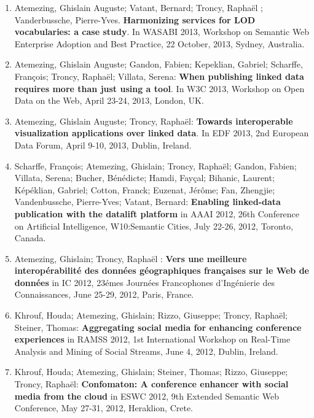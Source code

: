 \begin{enumerate}
\item Atemezing, Ghislain Auguste; Vatant, Bernard; Troncy, Rapha{\"e}l ; Vanderbussche, Pierre-Yves. \textbf{Harmonizing services for LOD vocabularies: a case study}. In WASABI 2013, Workshop on Semantic Web Enterprise Adoption and Best Practice, 22 October, 2013, Sydney, Australia.

\item Atemezing, Ghislain Auguste; Gandon, Fabien; Kepeklian, Gabriel; Scharffe, Fran\c{c}ois; Troncy, Rapha{\"e}l; Villata, Serena: 
\textbf{When publishing linked data requires more than just using a tool}. In 
W3C 2013, Workshop on Open Data on the Web, April 23-24, 2013, London, UK.

\item Atemezing, Ghislain Auguste; Troncy,  Rapha{\"e}l: \textbf{
Towards interoperable visualization applications over linked data}. In 
EDF 2013, 2nd European Data Forum, April 9-10, 2013, Dublin, Ireland.


\item Scharffe, Fran\c cois; Atemezing, Ghislain; Troncy, Rapha\"{e}l; Gandon, Fabien; Villata, Serena; Bucher, B\'{e}n\'{e}dicte; Hamdi, Fay\c cal; Bihanic, Laurent; K\'{e}p\'{e}klian, Gabriel; Cotton, Franck; Euzenat, J\'{e}r\^{o}me; Fan, Zhengjie; Vandenbussche, Pierre-Yves; Vatant, Bernard: \textbf{Enabling linked-data publication with the datalift platform} in
AAAI 2012, 26th Conference on Artificial Intelligence, W10:Semantic Cities, July 22-26, 2012, Toronto, Canada.


\item Atemezing, Ghislain; Troncy, Rapha\"{e}l : \textbf{Vers une meilleure interop\'{e}rabilit\'{e} des donn\'{e}es g\'{e}ographiques fran\c caises sur le Web de donn\'{e}es} in IC 2012, 23\'{e}mes Journ\'{e}es Francophones d'Ing\'{e}nierie des Connaissances, June 25-29, 2012, Paris, France.

\item Khrouf, Houda; Atemezing, Ghislain; Rizzo, Giuseppe; Troncy, Rapha\"{e}l; Steiner, Thomas:
\textbf{Aggregating social media for enhancing conference experiences} in RAMSS 2012, 1st International Workshop on Real-Time Analysis and Mining of Social Streams, June 4, 2012, Dublin, Ireland.

\item Khrouf, Houda; Atemezing, Ghislain; Steiner, Thomas; Rizzo, Giuseppe; Troncy, Rapha\"{e}l: 
\textbf{Confomaton: A conference enhancer with social media from the cloud} in ESWC 2012, 9th Extended Semantic Web Conference, May 27-31, 2012, Heraklion, Crete.


\end{enumerate}
